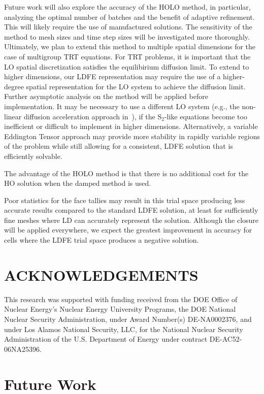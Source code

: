 Future work will also explore the accuracy of the HOLO method, in particular,
analyzing the optimal number of batches and the benefit of adaptive refinement.  This will likely
require the use of manufactured solutions.  The sensitivity of the method to mesh sizes and time step sizes will be
investigated more thoroughly.  
Ultimately, we plan to extend this method to multiple spatial dimensions for the 
case of multigroup TRT equations.  For TRT problems, it is important that
the LO spatial discretization satisfies the equilibirium diffusion limit.  To extend
to higher dimensions, our LDFE representation may require the use of a higher-degree
spatial representation for the LO system to achieve the diffusion
limit. Further asymptotic
analysis on the method will be applied before implementation. It may be necessary to use a different LO system (e.g., the non-linear diffusion
acceleration approach in~\cite{rmc}), if the S$_2$-like equations become too
inefficient or difficult to implement in higher dimensions.  Alternatively, a
variable Eddington Tensor approach may provide more stability in rapidly variable
regions of the problem while still allowing for a consistent, LDFE solution that is efficiently solvable.

The advantage of the HOLO method is that
there is no additional cost for the HO solution when the damped method is used.


Poor statistics for the face tallies may result in this trial space producing less
accurate results compared to the standard LDFE solution, at least for sufficiently fine meshes where LD
can accurately represent the solution.  Although the closure will be applied everywhere,
we expect the greatest improvement in accuracy for cells where the LDFE trial space
produces a negative solution.


\section*{ACKNOWLEDGEMENTS}

This research was supported with funding received from the DOE Office of Nuclear
Energy's Nuclear Energy University Programs, the DOE National
Nuclear Security Administration, under Award Number(s) DE-NA0002376, and under Los Alamos National Security,
LLC, for the National Nuclear Security Administration of the U.S. Department of
Energy under contract DE-AC52-06NA25396. 

\section{Future Work} 

